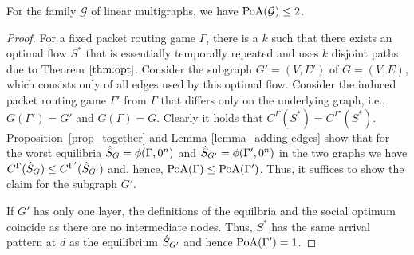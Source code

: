 \begin{theorem}\label{satz_PoA2} For the family $\mathcal{G}$ of linear multigraphs, we have
$\operatorname*{PoA}(\mathcal{G})\leq 2$.
\end{theorem}
\begin{proof}
For a fixed packet routing game $\Gamma$, there is a $k$ such that there exists an optimal flow $S^*$ that is essentially temporally repeated and uses $k$ disjoint paths due to Theorem $\ref{thm:opt}$. Consider the subgraph \mbox{$G'=(V,E')$} of $G=(V,E)$, which consists only of all edges used by this optimal flow. Consider the induced packet routing game $\Gamma'$ from $\Gamma$ that differs only on the underlying graph, i.e., \mbox{$G(\Gamma')=G'$} and $G(\Gamma)=G$. Clearly it holds that $C^{\Gamma}(S^*)= C^{\Gamma'}(S^*)$. \mbox{Proposition \ref{prop_together}} and Lemma \ref{lemma_adding edges} show that for the worst equilibria $\hat{S}_{G}=\phi(\Gamma,0^n)$ and $\hat{S}_{G'}=\phi(\Gamma',0^n)$ in the two graphs we have $C^{\Gamma}(\hat{S}_{G}) \leq C^{\Gamma'}(\hat{S}_{G'})$ and, hence, $\operatorname*{PoA}(\Gamma)\leq \operatorname*{PoA}(\Gamma')$. Thus, it suffices to show the claim for the subgraph $G'$.

If $G'$ has only one layer, the definitions of the equilbria and the social optimum coincide as there are no intermediate nodes. Thus, $S^*$ has the same arrival pattern at $d$ as the equilibrium $\hat{S}_{G'}$ and hence $\operatorname*{PoA}(\Gamma')=1$. 


\end{proof}
